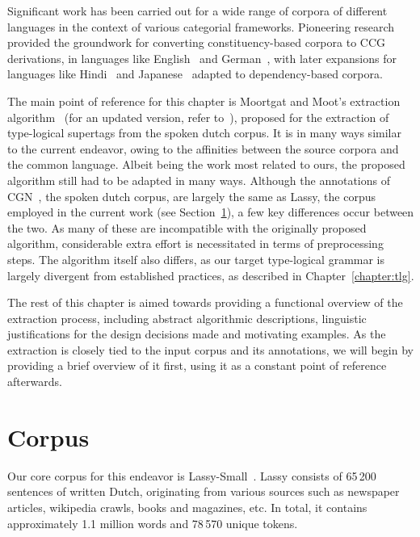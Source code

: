 Significant work has been carried out for a wide range of corpora of different languages in the context of various categorial frameworks. 
Pioneering research provided the groundwork for converting constituency-based corpora to CCG~\cite{steedman2011combinatory} derivations, in languages like English~\cite{hockenmaier2007ccgbank} and German~\cite{hockenmaier2006creating}, with later expansions for languages like Hindi~\cite{ambati2018hindi} and Japanese~\cite{uematsu2015integrating} adapted to dependency-based corpora.

The main point of reference for this chapter is Moortgat and Moot's extraction algorithm~\cite{moortgat2002using} (for an updated version, refer to~\cite{moot2010extraction}), proposed for the extraction of type-logical supertags from the spoken dutch corpus.
It is in many ways similar to the current endeavor, owing to the affinities between the source corpora and the common language.
Albeit being the work most related to ours, the proposed algorithm still had to be adapted in many ways.
Although the annotations of CGN~\cite{hoekstra2001syntactic}, the spoken dutch corpus, are largely the same as Lassy, the corpus employed in the current work (see Section~\ref{section:corpus}), a few key differences occur between the two.
As many of these are incompatible with the originally proposed algorithm, considerable extra effort is necessitated in terms of preprocessing steps.
The algorithm itself also differs, as our target type-logical grammar is largely divergent from established practices, as described in Chapter~\ref{chapter:tlg}.

The rest of this chapter is aimed towards providing a functional overview of the extraction process, including abstract algorithmic descriptions, linguistic justifications for the design decisions made and motivating examples.
As the extraction is closely tied to the input corpus and its annotations, we will begin by providing a brief overview of it first, using it as a constant point of reference afterwards.

\section{Corpus}
\label{section:corpus}
Our core corpus for this endeavor is Lassy-Small~\cite{Lassy}.
Lassy consists of 65\,200 sentences of written Dutch, originating from various sources such as newspaper articles, wikipedia crawls, books and magazines, etc.
In total, it contains approximately 1.1 million words and 78\,570 unique tokens.

